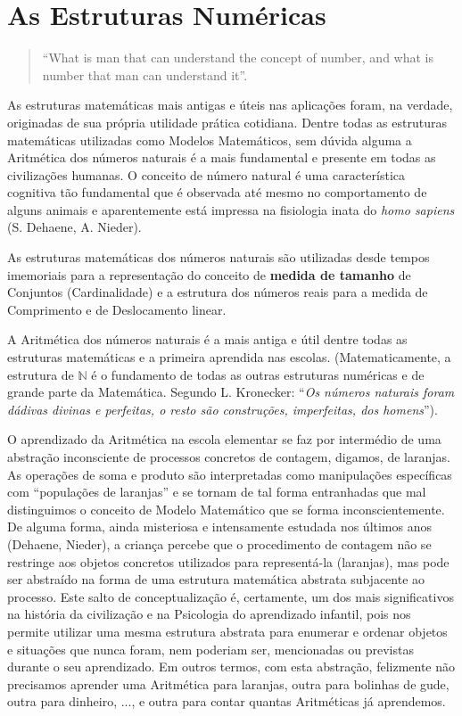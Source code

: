 \section{As Estruturas Numéricas}

\begin{quote}
    ``What is man that can understand the concept of number, and what is number that man can understand it''.

\end{quote}

    As estruturas matemáticas mais antigas e úteis nas aplicações foram, na verdade, originadas de sua própria utilidade prática cotidiana. Dentre todas as estruturas matemáticas utilizadas como Modelos Matemáticos, sem dúvida alguma a Aritmética dos números naturais é a mais fundamental e presente em todas as civilizações humanas. O conceito de número natural é uma característica cognitiva tão fundamental que é observada até mesmo no comportamento de alguns animais e aparentemente está impressa na fisiologia inata do \textit{homo sapiens} (S. Dehaene, A. Nieder).

    As estruturas matemáticas dos números naturais são utilizadas desde tempos imemoriais para a representação do conceito de \textbf{medida de tamanho} de Conjuntos (Cardinalidade) e a estrutura dos números reais para a medida de Comprimento e de Deslocamento linear.

    A Aritmética dos números naturais é a mais antiga e útil dentre todas as estruturas matemáticas e a primeira aprendida nas escolas. (Matematicamente, a estrutura de \(\mathbb{N}\) é o fundamento de todas as outras estruturas numéricas e de grande parte da Matemática. Segundo L. Kronecker: ``\textit{Os números naturais foram dádivas divinas e perfeitas, o resto são construções, imperfeitas, dos homens}'').

    O aprendizado da Aritmética na escola elementar se faz por intermédio de uma abstração inconsciente de processos concretos de contagem, digamos, de laranjas. As operações de soma e produto são interpretadas como manipulações específicas com ``populações de laranjas'' e se tornam de tal forma entranhadas que mal distinguimos o conceito de Modelo Matemático que se forma inconscientemente. De alguma forma, ainda misteriosa e intensamente estudada nos últimos anos (Dehaene, Nieder), a criança percebe que o procedimento de contagem não se restringe aos objetos concretos utilizados para representá-la (laranjas), mas pode ser abstraído na forma de uma estrutura matemática abstrata subjacente ao processo. Este salto de conceptualização é, certamente, um dos mais significativos na história da civilização e na Psicologia do aprendizado infantil, pois nos permite utilizar uma mesma estrutura abstrata para enumerar e ordenar objetos e situações que nunca foram, nem poderiam ser, mencionadas ou previstas durante o seu aprendizado. Em outros termos, com esta abstração, felizmente não precisamos aprender uma Aritmética para laranjas, outra para bolinhas de gude, outra para dinheiro, ..., e outra para contar quantas Aritméticas já aprendemos.


